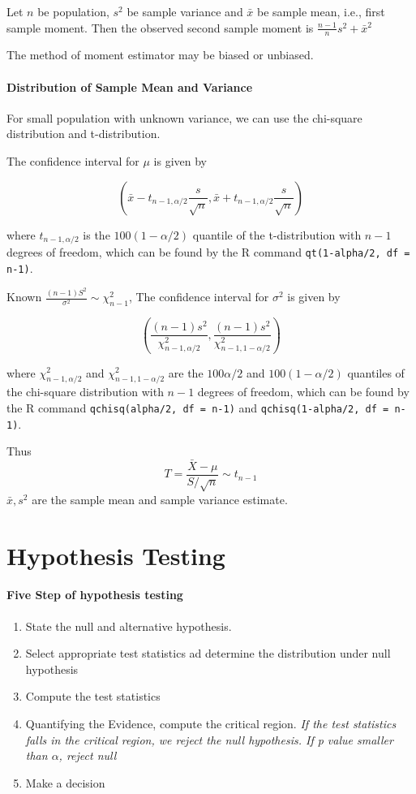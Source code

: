 \documentclass[10pt]{article}
\begin{document}
Let $n$ be population, $s^2$ be sample variance and $\bar{x}$ be sample mean, i.e., first sample moment. 
Then the observed second sample moment is $\frac{n-1}{n}s^2+\bar{x}^2$

The method of moment estimator may be biased or unbiased.

\paragraph{Distribution of Sample Mean and Variance}
For small population with unknown variance, we can use the chi-square distribution and t-distribution. 

The confidence interval for $\mu$ is given by

\begin{equation}
	(\bar{x} - t_{n-1, \alpha/2}\frac{s}{\sqrt{n}}, \bar{x} + t_{n-1, \alpha/2}\frac{s}{\sqrt{n}})
\end{equation}

where $t_{n-1, \alpha/2}$ is the $100(1-\alpha/2)$ quantile of the t-distribution with $n-1$ degrees of freedom, which can be found by the R command \texttt{qt(1-alpha/2, df = n-1)}.

Known $\frac{(n-1)S^2}{\sigma^2}\sim \chi^2_{n-1}$,
The confidence interval for $\sigma^2$ is given by

\begin{equation}
	(\frac{(n-1)s^2}{\chi^2_{n-1, \alpha/2}}, \frac{(n-1)s^2}{\chi^2_{n-1, 1-\alpha/2}})
\end{equation}

where $\chi^2_{n-1, \alpha/2}$ and $\chi^2_{n-1, 1-\alpha/2}$ are the $100\alpha/2$ and $100(1-\alpha/2)$ quantiles of the chi-square distribution with $n-1$ degrees of freedom, which can be found by the R command \texttt{qchisq(alpha/2, df = n-1)} and \texttt{qchisq(1-alpha/2, df = n-1)}.

Thus 
\begin{equation}
T=\frac{\bar{X}-\mu}{S/\sqrt{n}}\sim t_{n-1}
\end{equation}
$\bar{x}, s^2$ are the sample mean and sample variance estimate.

\section{Hypothesis Testing}
\paragraph{Five Step of hypothesis testing}
\begin{enumerate}
	\item State the null and alternative hypothesis.
	\item Select appropriate test statistics ad determine the distribution under null hypothesis
	\item Compute the test statistics
	\item Quantifying the Evidence, compute the critical region. \small \textit{If the test statistics falls in the critical region, we reject the null hypothesis. If p value smaller than $\alpha$, reject null}
	\item Make a decision
\end{enumerate}
\end{document}

